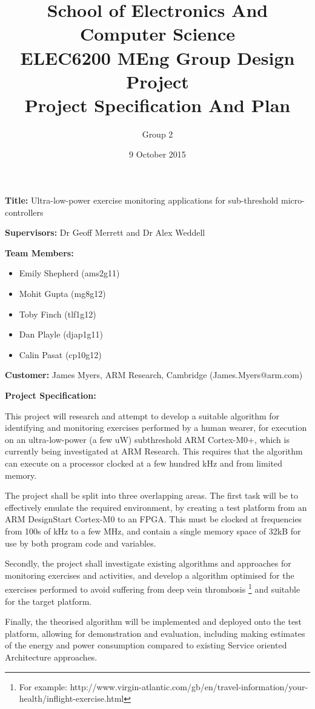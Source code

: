 \documentclass{article}
\title{School of Electronics And Computer Science \\
ELEC6200 MEng Group Design Project \\
Project Specification And Plan}
\author{Group 2}
\date{9 October 2015}
\begin{document}
\maketitle

\textbf{Title:} Ultra-low-power exercise monitoring applications for sub-threshold micro-controllers

\textbf{Supervisors:} Dr Geoff Merrett and Dr Alex Weddell

\textbf{Team Members:}
\begin{itemize}
	\item Emily Shepherd (ams2g11)
	\item Mohit Gupta (mg8g12)
	\item Toby Finch (tlf1g12)
	\item Dan Playle (djap1g11)
	\item Calin Pasat (cp10g12)
\end{itemize}

\textbf{Customer:} James Myers, ARM Research, Cambridge (James.Myers@arm.com)

\textbf{Project Specification:}

This project will research and attempt to develop a suitable algorithm for identifying and
monitoring exercises performed by a human wearer, for execution on an ultra-low-power
(a few uW) subthreshold ARM Cortex-M0+, which is currently being investigated at ARM Research.
This requires that the algorithm can execute on a processor clocked at a few hundred
kHz and from limited memory.

The project shall be split into three overlapping areas. The first task will be to effectively
emulate the required environment, by creating a test platform from an ARM DesignStart Cortex-M0
to an FPGA. This must be clocked at frequencies from 100s of kHz to a few MHz, and contain a
single memory space of 32kB for use by both program code and variables. 

Secondly, the project shall investigate existing algorithms and approaches for monitoring
exercises and activities, and develop a algorithm optimised for the exercises performed to avoid
suffering from deep vein thrombosis
\footnote{For example:
http://www.virgin-atlantic.com/gb/en/travel-information/your-health/inflight-exercise.html}
and suitable for the target platform.

Finally, the theorised algorithm will be implemented and deployed onto the test platform, allowing
for demonstration and evaluation, including making estimates of the energy and power consumption
compared to existing Service oriented Architecture approaches.
\end{document}
